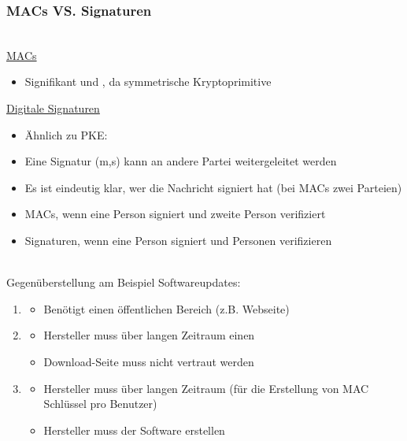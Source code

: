 \subsubsection*{MACs VS. Signaturen}
\\
\underline{MACs}
\begin{itemize}
    \item Signifikant  und , da symmetrische Kryptoprimitive
\end{itemize}
\underline{Digitale Signaturen}
\begin{itemize}
    \item Ähnlich zu PKE: 
    \item {} Eine Signatur (m,s) kann an andere Partei weitergeleitet werden
    \item {} Es ist eindeutig klar, wer die Nachricht signiert hat (bei MACs zwei Parteien)
\end{itemize}
\begin{itemize}
    \item MACs, wenn eine Person signiert und  zweite Person verifiziert
    \item Signaturen, wenn eine Person signiert und  Personen verifizieren
\end{itemize}
\\
Gegenüberstellung am Beispiel Softwareupdates:
\begin{enumerate}
    \item {}
    \begin{itemize}
        \item Benötigt einen öffentlichen  Bereich (z.B. Webseite)
    \end{itemize}
    \item {}
    \begin{itemize}
        \item Hersteller muss über langen Zeitraum einen 
        \item Download-Seite muss nicht vertraut werden
    \end{itemize}
    \item {}
    \begin{itemize}
        \item Hersteller muss über langen Zeitraum  (für die Erstellung von MAC Schlüssel pro Benutzer)
        \item Hersteller muss  der Software  erstellen
    \end{itemize}
\end{enumerate}
